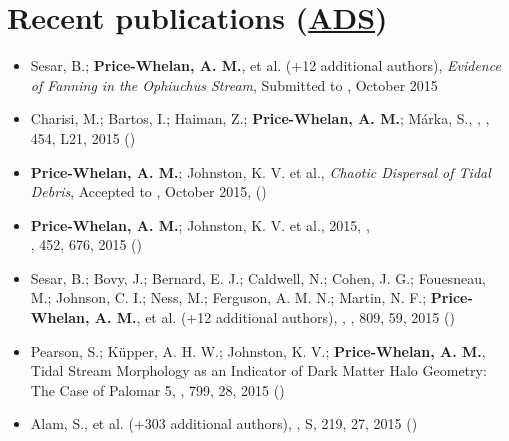 \documentclass[12pt,letterpaper]{article}
\begin{document}
\section*{Recent publications (\href{\adsurl}{ADS})}

	\begin{itemize}

\item Sesar, B.; {\bf Price-Whelan, A. M.}, et al. (+12 additional authors), 
    {\it Evidence of Fanning in the Ophiuchus Stream},
    Submitted to \apjl, October 2015

\item Charisi, M.; Bartos, I.; Haiman, Z.; {\bf Price-Whelan, A. M.}; M\'arka, S., 
    ,
    \mnrasl, 454, L21, 2015 ()

\item {\bf Price-Whelan, A. M.}; Johnston, K. V. et al., 
    {\it Chaotic Dispersal of Tidal Debris},
    Accepted to \mnras, October 2015, ()
    
\item {\bf Price-Whelan, A. M.}; Johnston, K. V. et al., 2015,
    ,\\
    \mnras, 452, 676, 2015 ()
    
\item Sesar, B.; Bovy, J.; Bernard, E. J.; Caldwell, N.; Cohen, J. G.; Fouesneau, M.; Johnson, C. I.; Ness, M.; Ferguson, A. M. N.; Martin, N. F.; {\bf Price-Whelan, A. M.}, et al. (+12 additional authors),
    ,
    \apj, 809, 59, 2015 ()

\item Pearson, S.; K\"upper, A. H. W.; Johnston, K. V.; {\bf Price-Whelan, A. M.}, 
    {Tidal Stream Morphology as an Indicator of Dark Matter Halo Geometry: The Case of Palomar 5},
    \apj, 799, 28, 2015 ()

\item Alam, S., et al. (+303 additional authors), 
    ,
    \apj S, 219, 27, 2015 ()
    

\end{itemize}
\end{document}
